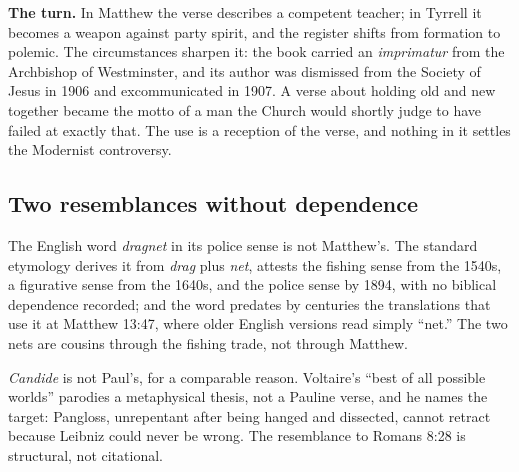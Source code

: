 \textbf{The turn.} In Matthew the verse describes a competent teacher; in Tyrrell it becomes a weapon against party spirit, and the register shifts from formation to polemic. The circumstances sharpen it: the book carried an \emph{imprimatur} from the Archbishop of Westminster, and its author was dismissed from the Society of Jesus in 1906 and excommunicated in 1907. A verse about holding old and new together became the motto of a man the Church would shortly judge to have failed at exactly that. The use is a reception of the verse, and nothing in it settles the Modernist controversy.

\subsection*{Two resemblances without dependence}

The English word \emph{dragnet} in its police sense is not Matthew's. The standard etymology derives it from \emph{drag} plus \emph{net}, attests the fishing sense from the 1540s, a figurative sense from the 1640s, and the police sense by 1894, with no biblical dependence recorded; and the word predates by centuries the translations that use it at Matthew 13:47, where older English versions read simply ``net.'' The two nets are cousins through the fishing trade, not through Matthew.

\emph{Candide} is not Paul's, for a comparable reason. Voltaire's ``best of all possible worlds'' parodies a metaphysical thesis, not a Pauline verse, and he names the target: Pangloss, unrepentant after being hanged and dissected, cannot retract because Leibniz could never be wrong. The resemblance to Romans 8:28 is structural, not citational.
